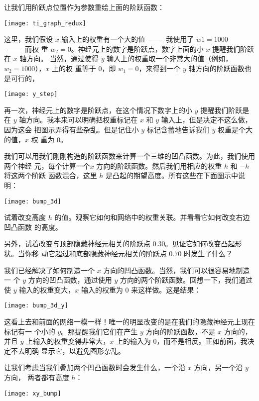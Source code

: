 让我们用阶跃点位置作为参数重绘上面的阶跃函数：
\begin{center}
  \texttt{[image: ti\_graph\_redux]}
\end{center}

这里，我们假设 $x$ 输入上的权重有一个大的值~——~我使用了 $w1 = 1000$~——~而权
重 $w_2 = 0$。神经元上的数字是阶跃点，数字上面的小 $x$ 提醒我们阶跃在 $x$ 轴方向。
当然，通过使得 $y$ 输入上的权重取一个非常大的值（例如，$w_2 = 1000$），$x$ 上的权
重等于 $0$，即 $w_1 = 0$，来得到一个 $y$ 轴方向的阶跃函数也是可行的，
\begin{center}
  \texttt{[image: y\_step]}
\end{center}

再一次，神经元上的数字是阶跃点，在这个情况下数字上的小 $y$ 提醒我们阶跃是在 $y$
轴方向。我本来可以明确把权重标记在 $x$ 和 $y$ 输入上，但是决定不这么做，因为这会
把图示弄得有些杂乱。但是记住小 $y$ 标记含蓄地告诉我们 $y$ 权重是个大的值，$x$ 权
重为 $0$。

我们可以用我们刚刚构造的阶跃函数来计算一个三维的凹凸函数。为此，我们使用两个神经
元，每个计算一个$x$ 方向的阶跃函数。然后我们用相应的权重 $h$ 和 $-h$ 将这两个阶跃
函数混合，这里 $h$ 是凸起的期望高度。所有这些在下面图示中说明：
\begin{center}
  \texttt{[image: bump\_3d]}
\end{center}

试着改变高度 $h$ 的值。观察它如何和网络中的权重关联。并看看它如何改变右边凹凸函数
的高度。

另外，试着改变与顶部隐藏神经元相关的阶跃点 $0.30$。见证它如何改变凸起形状。当你移
动它超过和底部隐藏神经元相关的阶跃点 $0.70$ 时发生了什么？

我们已经解决了如何制造一个 $x$ 方向的凹凸函数。当然，我们可以很容易地制造一
个 $y$ 方向的凹凸函数，通过使用 $y$ 方向的两个阶跃函数。回想一下，我们通过使 $y$
输入的权重变大，$x$ 输入的权重为 $0$ 来这样做。这是结果：
\begin{center}
  \texttt{[image: bump\_3d\_y]}
\end{center}

这看上去和前面的网络一模一样！唯一的明显改变的是在我们的隐藏神经元上现在标记有一
个小的 $y$。那提醒我们它们在产生 $y$ 方向的阶跃函数，不是 $x$ 方向的，并且 $y$
上输入的权重变得非常大，$x$ 上的输入为 $0$，而不是相反。正如前面，我决定不去明确
显示它，以避免图形杂乱。

让我们考虑当我们叠加两个凹凸函数时会发生什么，一个沿 $x$ 方向，另一个沿 $y$ 方向，
两者都有高度 $h$：
\begin{center}
  \texttt{[image: xy\_bump]}
\end{center}


